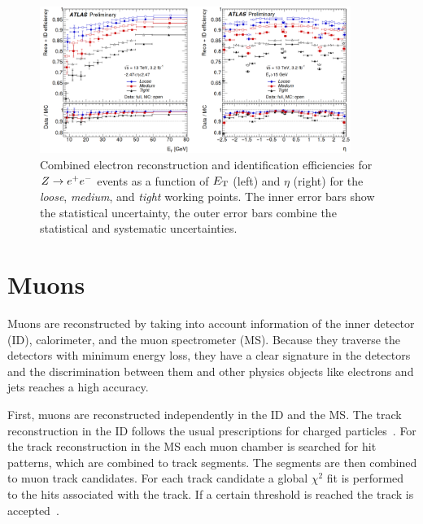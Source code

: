 \begin{figure}[!htb]
    \begin{center}
        \includegraphics[width=0.9\textwidth]{./figures/object_selection/el_id_eff.png}
        \caption{Combined electron reconstruction and identification efficiencies for $Z \to e^+e^-$ events as a
                 function of $E_\text{T}$ (left) and $\eta$ (right) for the \emph{loose}, \emph{medium}, and \emph{tight}
                 working points. The inner error bars show the statistical uncertainty, the outer error bars combine
                 the statistical and systematic uncertainties.~\cite{ATLAS-CONF-2016-024}}\label{fig:object_selection:el_id_eff}
    \end{center}
\end{figure}

\section{Muons}\label{sec:object_selection:muons}

Muons are reconstructed by taking into account information of the inner detector (ID), calorimeter, and the
muon spectrometer (MS).
Because  they traverse the detectors with minimum energy loss, they have a clear signature in the detectors and the
discrimination between them and other physics objects like electrons and jets reaches a high accuracy.

First, muons are reconstructed independently in the ID and the MS\@. The track reconstruction in the ID follows the
usual prescriptions for charged particles~\cite{ATL-SOFT-PUB-2007-007,ATLAS-CONF-2010-072}.
For the track reconstruction in the MS each muon chamber is searched for hit patterns, which are combined to track
segments. The segments are then combined to muon track candidates. For each track candidate a global $\chi^2$ fit
is performed to the hits associated with the track. If a certain threshold is reached the track is accepted~\cite{PERF-2015-10}.

